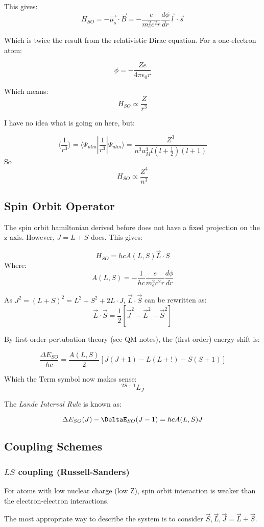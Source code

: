 \documentclass[12pt]{article}
\begin{document}
This gives:
\[H_{SO} = -\vec{\mu_s}\cdot\vec{B} = -\frac{e}{m^2_ec^2 r}\frac{d\phi}{dr}{\vec{l}\cdot \vec{s}}\]

Which is twice the result from the relativistic Dirac equation. For a one-electron atom:

\[\phi = -\frac{Ze}{4\pi\epsilon_0 r}\]

Which means:
\[H_{SO} \propto \frac{Z}{r^3}\]

I have no idea what is going on here, but:

\[ \langle \frac{1}{r^3} \rangle = \langle \Psi_{nlm} | \frac1{r^3} |\Psi_{nlm}\rangle = \frac{Z^3}{n^3a^3_Ml(l+\frac12)(l+1)}\]
So
\[H_{SO} \propto \frac{Z^4}{n^3}\]

\subsection{Spin Orbit Operator}
The spin orbit hamiltonian derived before does not have a fixed projection on the z axis. However, $J=L+S$ does. This gives:

\[H_{SO} = hc A(L,S) \vec{L} \cdot {S}\]
Where:
\[A(L,S) = -\frac{1}{hc}\frac{e}{m^2_ec^2 r}\frac{d\phi}{dr}\]

As $J^2 = (L+S)^2 = L^2+S^2+2L\cdot J$, $\vec{L}\cdot\vec{S}$ can be rewritten as:
\[ \vec{L}\cdot\vec{S} = \frac12 [\vec{J}^2 - \vec{L}^2 - \vec{S}^2]\]

By first order pertubation theory (see QM notes), the (first order) energy shift is:

\[\frac{\Delta E_{SO}}{hc} = \frac{A(L,S)}{2}[J(J+1) - L(L+!) - S(S+1)]\]

Which the Term symbol now makes sense:
\[ ^{2S+1}L_J\]

The \textit{Lande Interval Rule} is known as:

\[\Delta E_{SO}(J) - \DeltaE_{SO}(J-1) = hc A(L,S) J\]

\subsection{Coupling Schemes}
\subsubsection{$LS$ coupling (Russell-Sanders)}

For atoms with low nuclear charge (low Z), spin orbit interaction is weaker than the electron-electron interactions.

The most appropriate way to describe the system is to consider $\vec{S}, \vec{L}, \vec{J} = \vec{L}+\vec{S}$.  
\end{document}
